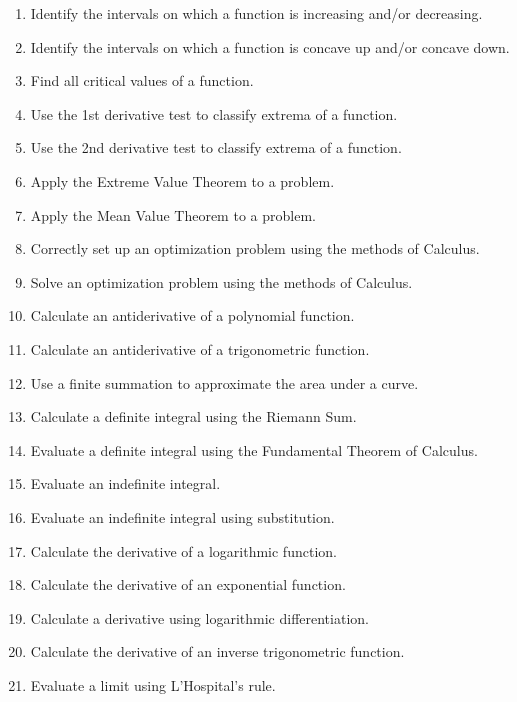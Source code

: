 \documentclass[12pt,landscape]{article}
\begin{document}
\begin{multicols}{2}
\begin{enumerate}
\item Identify the intervals on which a function is increasing and/or decreasing.\\
\item Identify the intervals on which a function is concave up and/or concave down.\\
\item Find all critical values of a function.\\
\item Use the 1st derivative test to classify extrema of a function. \\
\item Use the 2nd derivative test to classify extrema of a function.\\
\item Apply the Extreme Value Theorem to a problem.\\
\item Apply the Mean Value Theorem to a problem.\\
\item Correctly set up an optimization problem using the methods of Calculus.\\
\item Solve an optimization problem using the methods of Calculus.\\
\item Calculate an antiderivative of a polynomial function.\\
\item Calculate an antiderivative of a trigonometric function.\\
\item Use a finite summation to approximate the area under a curve.\\
\item Calculate a definite integral using the Riemann Sum.\\
\item Evaluate a definite integral using the Fundamental Theorem of Calculus.\\
\item Evaluate an indefinite integral.\\
\item Evaluate an indefinite integral using substitution.\\
\item Calculate the derivative of a logarithmic function.\\
\item Calculate the derivative of an exponential function.\\
\item Calculate a derivative using logarithmic differentiation.\\
\item Calculate the derivative of an inverse trigonometric function.\\
\item Evaluate a limit using L'Hospital's rule.\\
\end{enumerate}
\newpage 

\end{multicols}
\end{document}
